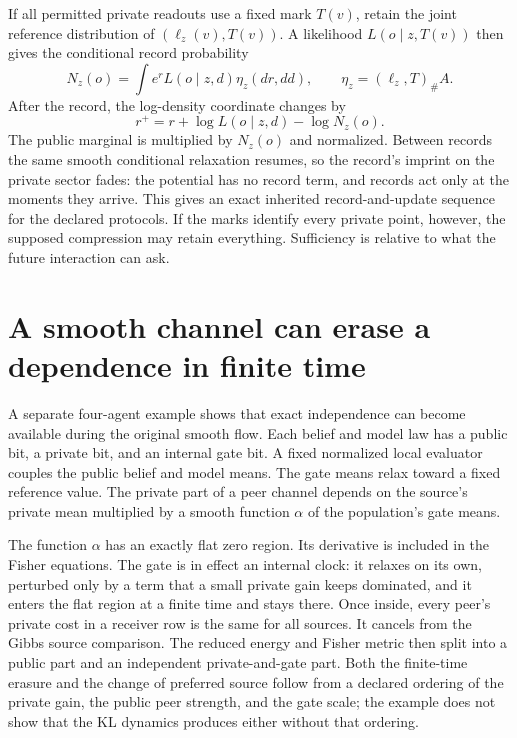 If all permitted private readouts use a fixed mark $T(v)$, retain the joint reference distribution of $(\ell_z(v),T(v))$. A likelihood $L(o\mid z,T(v))$ then gives the conditional record probability
\begin{equation}
 N_z(o)=\int e^r L(o\mid z,d)\eta_z(dr,dd),\qquad
 \eta_z=(\ell_z,T)_\#A.
\end{equation}
After the record, the log-density coordinate changes by
\begin{equation}
 r^+=r+\log L(o\mid z,d)-\log N_z(o).
\end{equation}
The public marginal is multiplied by $N_z(o)$ and normalized. Between records the same smooth conditional relaxation resumes, so the record's imprint on the private sector fades: the potential has no record term, and records act only at the moments they arrive. This gives an exact inherited record-and-update sequence for the declared protocols. If the marks identify every private point, however, the supposed compression may retain everything. Sufficiency is relative to what the future interaction can ask.

\section{A smooth channel can erase a dependence in finite time}

A separate four-agent example shows that exact independence can become available during the original smooth flow. Each belief and model law has a public bit, a private bit, and an internal gate bit. A fixed normalized local evaluator couples the public belief and model means. The gate means relax toward a fixed reference value. The private part of a peer channel depends on the source's private mean multiplied by a smooth function $\alpha$ of the population's gate means.

The function $\alpha$ has an exactly flat zero region. Its derivative is included in the Fisher equations. The gate is in effect an internal clock: it relaxes on its own, perturbed only by a term that a small private gain keeps dominated, and it enters the flat region at a finite time and stays there. Once inside, every peer's private cost in a receiver row is the same for all sources. It cancels from the Gibbs source comparison. The reduced energy and Fisher metric then split into a public part and an independent private-and-gate part. Both the finite-time erasure and the change of preferred source follow from a declared ordering of the private gain, the public peer strength, and the gate scale; the example does not show that the KL dynamics produces either without that ordering.


